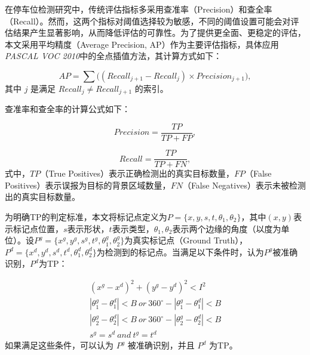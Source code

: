 在停车位检测研究中，传统评估指标多采用查准率（Precision）和查全率（Recall）。然而，这两个指标对阈值选择较为敏感，不同的阈值设置可能会对评估结果产生显著影响，从而降低评估的可靠性。为了提供更全面、更稳定的评估，本文采用平均精度（Average Precision, AP）作为主要评估指标，具体应用\textit{PASCAL VOC 2010}中的全点插值方法，其计算方式如下：

\begin{equation}
AP = \sum \Big((Recall_{j+1}-Recall_{j}) \times Precision_{j+1} \Big),
\end{equation}
其中 $j$ 是满足 $Recall_{j} \neq Recall_{j+1}$ 的索引。

查准率和查全率的计算公式如下：

\begin{equation}
Precision = \frac{TP}{TP + FP},
\end{equation}

\begin{equation}
Recall = \frac{TP}{TP + FN},
\end{equation}
式中，$TP$（True Positives）表示正确检测出的真实目标数量，$FP$（False Positives）表示误报为目标的背景区域数量，$FN$（False Negatives）表示未被检测出的真实目标数量。

为明确TP的判定标准，本文将标记点定义为$P=\{x, y, s, t, \theta_{1}, \theta_{2}\}$，其中$(x, y)$表示标记点位置，$s$表示形状，$t$表示类型，$\theta_{1}, \theta_{2}$表示两个边缘的角度（以度为单位）。设$P^{g}=\{x^{g}, y^{g}, s^{g}, t^{g}, \theta_{1}^{g}, \theta_{2}^{g}\}$为真实标记点（Ground Truth），$P^{d}=\{x^{d}, y^{d}, s^{d}, t^{d}, \theta_{1}^{d}, \theta_{2}^{d}\}$为检测到的标记点。当满足以下条件时，认为$P^{g}$被准确识别，$P^{d}$为TP：

\begin{subequations}
  \begin{align}
  (x^{g}-x^{d})^{2} + (y^{g}-y^{d})^{2} < I^{2} \\
|\theta_{1}^{g} - \theta_{1}^{d}| < B \ or \ 360^{\circ} - |\theta_{1}^{g} - \theta_{1}^{d}| < B \\
|\theta_{2}^{g} - \theta_{2}^{d}| < B \ or \ 360^{\circ} - |\theta_{2}^{g} - \theta_{2}^{d}| < B \\
s^{g} = s^{d} \ and \ t^{g} = t^{d}
  \end{align}
  \end{subequations}
如果满足这些条件，可以认为 $P^{g}$ 被准确识别，并且 $P^{d}$ 为TP。

